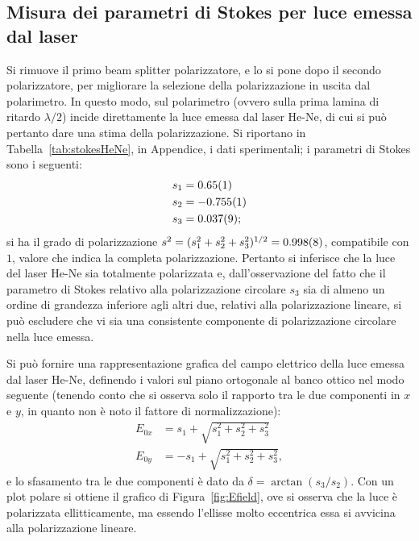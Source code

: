 \documentclass[10pt,oneside,a4paper]{article}
\begin{document}
\begin{multicols}{2}
\subsection{Misura dei parametri di Stokes per luce emessa dal laser}
Si rimuove il primo beam splitter polarizzatore, e lo si pone dopo il secondo polarizzatore, per migliorare la selezione della polarizzazione in uscita dal polarimetro. In questo modo, sul polarimetro (ovvero sulla prima lamina di ritardo $\lambda / 2$) incide direttamente la luce emessa dal laser He-Ne, di cui si può pertanto dare una stima della polarizzazione. Si riportano in Tabella~\ref{tab:stokesHeNe}, in Appendice, i dati sperimentali; i parametri di Stokes sono i seguenti:
\[
\begin{aligned}
s_1 &= \SI{0.65 \pm 0.01}{} \\
s_2 &= \SI{-0.755 \pm 0.001}{}\\
s_3 &= \SI{0.037 \pm 0.009}{};\\
\end{aligned}
\]
si ha il grado di polarizzazione $s^2 = (s_1^2+s_2^2+s_3^2)^{1/2} = \SI{0.998 \pm 0.008}{}$, compatibile con $1$, valore che indica la completa polarizzazione. Pertanto si inferisce che la luce del laser He-Ne sia totalmente polarizzata e, dall'osservazione del fatto che il parametro di Stokes relativo alla polarizzazione circolare $s_3$ sia di almeno un ordine di grandezza inferiore agli altri due, relativi alla polarizzazione lineare, si può escludere che vi sia una consistente componente di polarizzazione circolare nella luce emessa.

Si può fornire una rappresentazione grafica del campo elettrico della luce emessa dal laser He-Ne, definendo i valori sul piano ortogonale al banco ottico nel modo seguente (tenendo conto che si osserva solo il rapporto tra le due componenti in $x$ e $y$, in quanto non è noto il fattore di normalizzazione):
\[
\begin{aligned}
E_{0x} &= s_1 + \sqrt{s_1^2+s_2^2+s_3^2} \\
E_{0y} &= -s_1 + \sqrt{s_1^2+s_2^2+s_3^2},
\end{aligned}
\]
e lo sfasamento tra le due componenti è dato da $\delta = \arctan(s_3/s_2)$. Con un plot polare si ottiene il grafico di Figura~\ref{fig:Efield}, ove si osserva che la luce è polarizzata ellitticamente, ma essendo l'ellisse molto eccentrica essa si avvicina alla polarizzazione lineare. 


\end{multicols}
\end{document}
